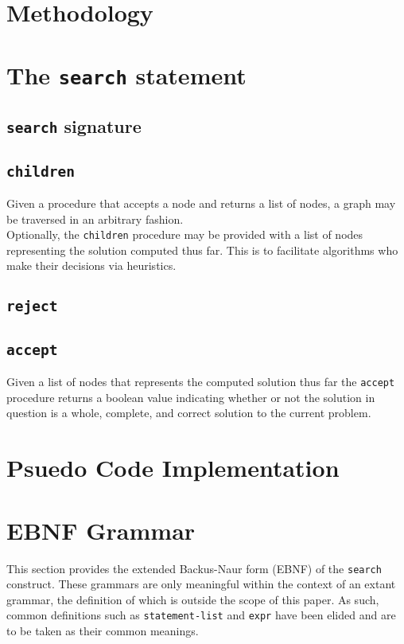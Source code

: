 \documentclass[runningheads]{llncs}
\newcommand{\code}[1]{\texttt{#1}}
\begin{document}
\section{Methodology}

\section{The \code{search} statement}

\subsection{\code{search} signature}

\subsection{\code{children}}
Given a procedure that accepts a node and returns a list of nodes, a graph may be traversed in an arbitrary fashion.
\\
Optionally, the \code{children} procedure may be provided with a list of nodes representing the solution computed thus far. This is to facilitate algorithms who make their decisions via heuristics.

\subsection{\code{reject}}

\subsection{\code{accept}}
Given a list of nodes that represents the computed solution thus far the \code{accept} procedure returns a boolean value indicating whether or not the solution in question is a whole, complete, and correct solution to the current problem.

\section{Psuedo Code Implementation}

\section{EBNF Grammar}
This section provides the extended Backus-Naur form (EBNF) of the \code{search} construct. These grammars are only meaningful within the context of an extant grammar, the definition of which is outside the scope of this paper. As such, common definitions such as \code{statement-list} and \code{expr} have been elided and are to be taken as their common meanings.
\end{document}
